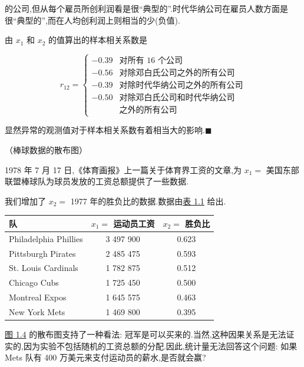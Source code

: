 
的公司,但从每个雇员所创利润看是很“典型的”.时代华纳公司在雇员人数方面是很“典型的”,而在人均创利润上则相当的少(负值).

由 $x_1$ 和 $x_2$ 的值算出的样本相关系数是

\[
r_{12} = \begin{cases}
-0.39 & \text{对所有 16 个公司}\\
-0.56 & \text{对除邓白氏公司之外的所有公司}\\
-0.39 & \text{对除时代华纳公司之外的所有公司}\\
-0.50 & \text{对除邓白氏公司和时代华纳公司}\\
      & \text{之外的所有公司}
\end{cases}
\]

显然异常的观测值对于样本相关系数有着相当大的影响.\hfill$\blacksquare$

\quad（棒球数据的散布图）

1978 年 7 月 17 日,《体育画报》上一篇关于体育界工资的文章,为 $x_1 = $ 美国东部联盟棒球队为球员发放的工资总额提供了一些数据.

我们增加了 $x_2 = $ 1977 年的胜负比的数据.数据由\hyperref[tab:1.1]{表 1.1} 给出.

\begin{mvtable}
\begin{tabular}{lcc}
\toprule
队 & $x_1 = $ 运动员工资 & $x_2 = $ 胜负比 \\
\midrule
Philadelphia Phillies & 3 497 900 & 0.623 \\
Pittsburgh Pirates & 2 485 475 & 0.593 \\
St. Louis Cardinals & 1 782 875 & 0.512 \\
Chicago Cubs & 1 725 450 & 0.500 \\
Montreal Expos & 1 645 575 & 0.463 \\
New York Mets & 1 469 800 & 0.395 \\
\bottomrule
\end{tabular}
\label{tab:1.1}
\end{mvtable}

\hyperref[fig:1.4]{图 1.4} 的散布图支持了一种看法: 冠军是可以买来的.当然,这种因果关系是无法证实的,因为实验不包括随机的工资总额的分配.因此,统计量无法回答这个问题: 如果 Mets 队有 400 万美元来支付运动员的薪水,是否就会赢?

